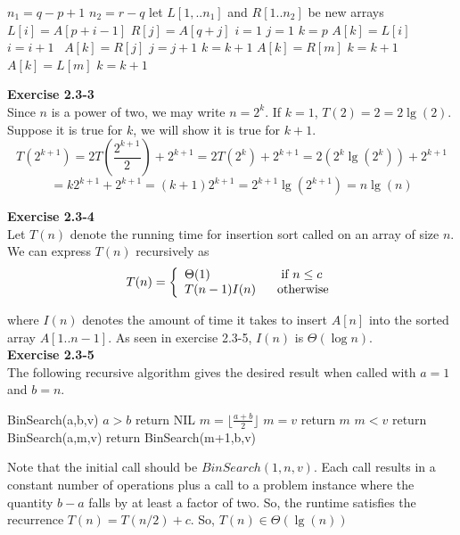 \documentclass{article}
\begin{document}
\begin{algorithm}
\caption{$Merge(A,p,q,r)$}
\begin{algorithmic}[1]
\State $n_1 = q-p+1$
\State $n_2 = r-q$
\State let $L[1,..n_1]$ and $R[1..n_2]$ be new arrays
	\State $L[i] = A[p+i-1]$
\EndFor
{}
	\State $R[j] = A[q+j]$
\EndFor
\State $i=1$
\State $j=1$
\State $k=p$
		\State $A[k] = L[i]$
		\State $i = i+1$
	\Else  $\,\,\,A[k] = R[j]$
		\State $j = j+1$
	\EndIf
\State $k = k + 1$
\EndWhile
{}
		\State $A[k] = R[m]$
		\State $k = k + 1$	
	\EndFor
\EndIf
{}
		\State $A[k] = L[m]$
		\State $k = k + 1$
	\EndFor
\EndIf
\end{algorithmic}
\end{algorithm}


\noindent\textbf{Exercise 2.3-3}\\

Since $n$ is a power of two, we may write $n= 2^k$. If $k=1$, $T(2) = 2 = 2\lg(2)$. Suppose it is true for $k$, we will show it is true for $k+1$.
\[
T(2^{k+1}) = 2T\left(\frac{2^{k+1}}{2}\right) + 2^{k+1} = 2T\left(2^{k}\right) + 2^{k+1} = 2(2^k\lg(2^k)) + 2^{k+1} \]\[= k2^{k+1}+ 2^{k+1} = (k+1)2^{k+1} = 2^{k+1} \lg(2^{k+1}) = n\lg(n)
\]

\noindent\textbf{Exercise 2.3-4}\\

Let $T(n)$ denote the running time for insertion sort called on an array of size $n$.  We can express $T(n)$ recursively as 
\[ T(n) = \left\{ \begin{array}{l} \Theta(1) \hspace{2cm} \mbox{if } n \leq c \\ T(n-1)I(n) \hspace{.6cm} \mbox{otherwise}\end{array} \right. \]

where $I(n)$ denotes the amount of time it takes to insert $A[n]$ into the sorted array $A[1..n-1]$.  As seen in exercise 2.3-5, $I(n)$ is $\Theta(\log n)$. \\


\noindent\textbf{Exercise 2.3-5} \\

The following recursive algorithm gives the desired result when called with $a=1$ and $b=n$.

\begin{algorithm}\begin{algorithmic}[1]
\State BinSearch(a,b,v)
\If $a>b$
\State return NIL
\EndIf
\State $m = \lfloor \frac{a+b}{2}\rfloor$
\If $m=v$
\State return $m$
\EndIf
\If $m<v$
\State return BinSearch(a,m,v)
\EndIf
\State return BinSearch(m+1,b,v)
\end{algorithmic}
\end{algorithm}
Note that the initial call should be $BinSearch(1,n,v)$. Each call results in a constant number of operations plus a call to a problem instance where the quantity $b-a$ falls by at least a factor of two. So, the runtime satisfies the recurrence $T(n)= T(n/2)+c$. So, $T(n)\in\Theta(\lg(n))$ \\
\end{document}
